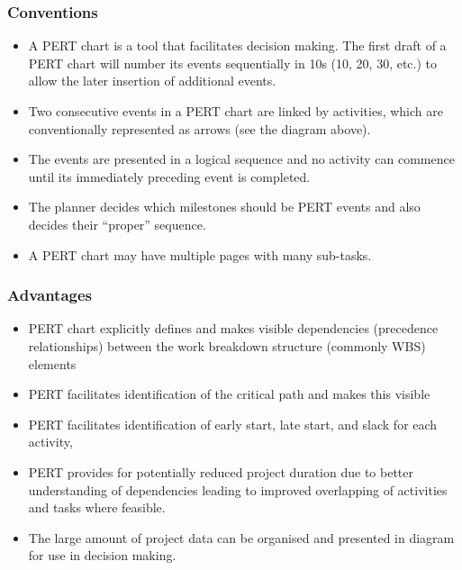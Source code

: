 \subsubsection{Conventions}

\begin{itemize}
\item A PERT chart is a tool that facilitates decision making. The first draft of a PERT chart will number its events sequentially in 10s (10, 20, 30, etc.) to allow the later insertion of additional events.
\item Two consecutive events in a PERT chart are linked by activities, which are conventionally represented as arrows (see the diagram above).
\item The events are presented in a logical sequence and no activity can commence until its immediately preceding event is completed.
\item The planner decides which milestones should be PERT events and also decides their “proper” sequence.
\item A PERT chart may have multiple pages with many sub-tasks.
\end{itemize}

\subsubsection{Advantages}
\begin{itemize}
\item PERT chart explicitly defines and makes visible dependencies (precedence relationships) between the work breakdown structure (commonly WBS) elements
\item PERT facilitates identification of the critical path and makes this visible
\item PERT facilitates identification of early start, late start, and slack for each activity,
\item PERT provides for potentially reduced project duration due to better understanding of dependencies leading to improved overlapping of activities and tasks where feasible.
\item The large amount of project data can be organised and presented in diagram for use in decision making.
\end{itemize}

